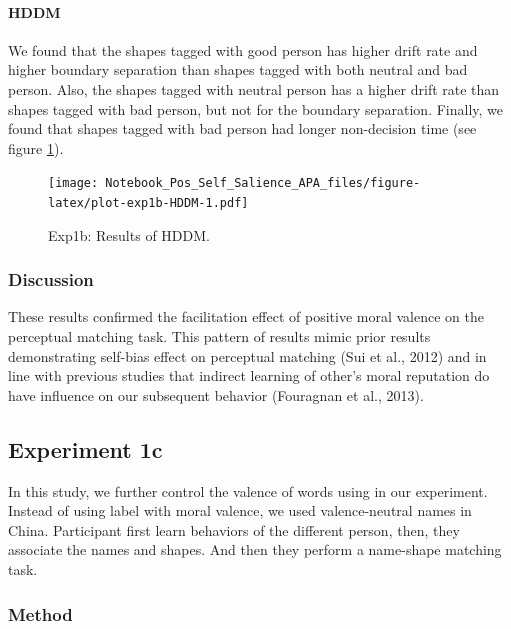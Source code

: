 \documentclass[
  english,
  man]{apa6}
\let\oldparagraph\paragraph
\renewcommand{\paragraph}[1]{\oldparagraph{#1}\mbox{}}
\begin{document}
\hypertarget{hddm-1}{%
\paragraph{HDDM}\label{hddm-1}}

We found that the shapes tagged with good person has higher drift rate and higher boundary separation than shapes tagged with both neutral and bad person. Also, the shapes tagged with neutral person has a higher drift rate than shapes tagged with bad person, but not for the boundary separation. Finally, we found that shapes tagged with bad person had longer non-decision time (see figure \ref{fig:plot-exp1b-HDDM}).

\begin{figure}
\centering
\texttt{[image: Notebook\_Pos\_Self\_Salience\_APA\_files/figure-latex/plot-exp1b-HDDM-1.pdf]}
\caption{\label{fig:plot-exp1b-HDDM}Exp1b: Results of HDDM.}
\end{figure}

\hypertarget{discussion}{%
\subsubsection{Discussion}\label{discussion}}

These results confirmed the facilitation effect of positive moral valence on the perceptual matching task. This pattern of results mimic prior results demonstrating self-bias effect on perceptual matching (Sui et al., 2012) and in line with previous studies that indirect learning of other's moral reputation do have influence on our subsequent behavior (Fouragnan et al., 2013).

\hypertarget{experiment-1c}{%
\subsection{Experiment 1c}\label{experiment-1c}}

In this study, we further control the valence of words using in our experiment. Instead of using label with moral valence, we used valence-neutral names in China. Participant first learn behaviors of the different person, then, they associate the names and shapes. And then they perform a name-shape matching task.

\hypertarget{method-1}{%
\subsubsection{Method}\label{method-1}}
\end{document}
